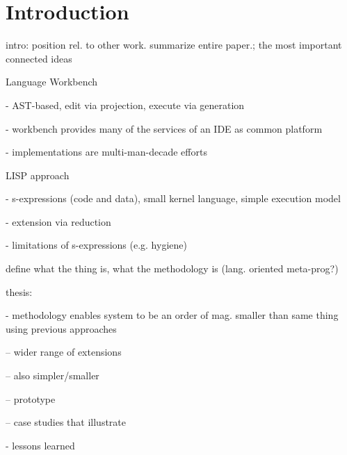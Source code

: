 \section{Introduction}
\label{intro}

intro: position rel. to other work. summarize entire paper.; the most important connected ideas

Language Workbench

- AST-based, edit via projection, execute via generation

- workbench provides many of the services of an IDE as common platform

- implementations are multi-man-decade efforts

LISP approach

- s-expressions (code and data), small kernel language, simple execution model

- extension via reduction

- limitations of s-expressions (e.g. hygiene)

define what the thing is, what the methodology is (lang. oriented meta-prog?)

thesis:

- methodology enables system to be an order of mag. smaller than same thing using previous approaches

-- wider range of extensions

-- also simpler/smaller

-- prototype

-- case studies that illustrate


- lessons learned






